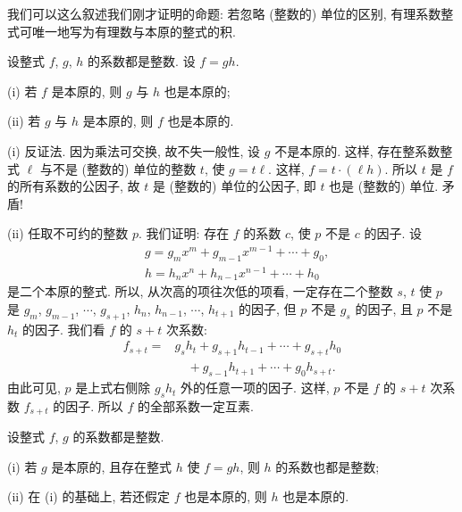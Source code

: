 \begin{remark}
    我们可以这么叙述我们刚才证明的命题: 若忽略 (整数的) 单位的区别, 有理系数整式可唯一地写为有理数与本原的整式的积.
\end{remark}

\begin{proposition}
    设整式 $f$, $g$, $h$ 的系数都是整数. 设 $f = gh$.

    (i) 若 $f$ 是本原的, 则 $g$ 与 $h$ 也是本原的;

    (ii) 若 $g$ 与 $h$ 是本原的, 则 $f$ 也是本原的.
\end{proposition}

\begin{pf}
    (i) 反证法. 因为乘法可交换, 故不失一般性, 设 $g$ 不是本原的. 这样, 存在整系数整式 $\ell$ 与不是 (整数的) 单位的整数 $t$, 使 $g = t\ell$. 这样, $f = t \cdot (\ell h)$. 所以 $t$ 是 $f$ 的所有系数的公因子, 故 $t$ 是 (整数的) 单位的公因子, 即 $t$ 也是 (整数的) 单位. 矛盾!

    (ii) 任取不可约的整数 $p$. 我们证明: 存在 $f$ 的系数 $c$, 使 $p$ 不是 $c$ 的因子. 设
    \begin{align*}
         & g = g_m x^m + g_{m-1} x^{m-1} + \cdots + g_0, \\
         & h = h_n x^n + h_{n-1} x^{n-1} + \cdots + h_0
    \end{align*}
    是二个本原的整式. 所以, 从次高的项往次低的项看, 一定存在二个整数 $s$, $t$ 使 $p$ 是 $g_m$, $g_{m-1}$, $\cdots$, $g_{s+1}$, $h_n$, $h_{n-1}$, $\cdots$, $h_{t+1}$ 的因子, 但 $p$ 不是 $g_s$ 的因子, 且 $p$ 不是 $h_t$ 的因子. 我们看 $f$ 的 $s+t$ 次系数:
    \begin{align*}
        f_{s+t}
        = {} & g_s h_t + g_{s+1} h_{t-1} + \cdots + g_{s+t} h_0  \\
             & \quad + g_{s-1} h_{t+1} + \cdots + g_{0} h_{s+t}.
    \end{align*}
    由此可见, $p$ 是上式右侧除 $g_s h_t$ 外的任意一项的因子. 这样, $p$ 不是 $f$ 的 $s+t$ 次系数 $f_{s+t}$ 的因子. 所以 $f$ 的全部系数一定互素.
\end{pf}

\begin{proposition}
    设整式 $f$, $g$ 的系数都是整数.

    (i) 若 $g$ 是本原的, 且存在整式 $h$ 使 $f = gh$, 则 $h$ 的系数也都是整数;

    (ii) 在 (i) 的基础上, 若还假定 $f$ 也是本原的, 则 $h$ 也是本原的.
\end{proposition}

